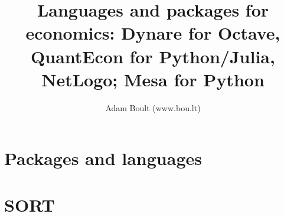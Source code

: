 \documentclass[oneside]{book}
\begin{document}
\author{Adam Boult (www.bou.lt)}
\title{Languages and packages for economics: Dynare for Octave, QuantEcon for Python/Julia, NetLogo; Mesa for Python}
\maketitle

\setcounter{tocdepth}{0}
\tableofcontents



\part{Packages and languages}





\part{SORT}

\end{document}

